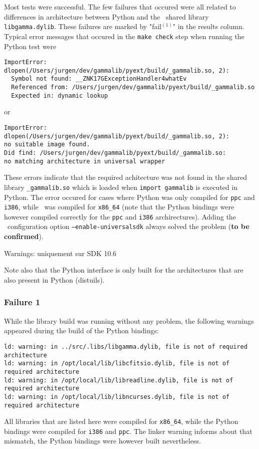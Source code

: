 \documentclass{article}[12pt,a4]
\begin{document}
Most tests were successful.
The few failures that occured were all related to differences in architecture between Python and
the \this\ shared library {\tt libgamma.dylib}.
These failures are marked by "fail$^{(1)}$" in the results column.
Typical error messages that occured in the {\tt make check} step when running the Python
test were
\begin{verbatim}
ImportError: dlopen(/Users/jurgen/dev/gammalib/pyext/build/_gammalib.so, 2): 
  Symbol not found: __ZNK17GExceptionHandler4whatEv
  Referenced from: /Users/jurgen/dev/gammalib/pyext/build/_gammalib.so
  Expected in: dynamic lookup
\end{verbatim}
or
\begin{verbatim}
ImportError: dlopen(/Users/jurgen/dev/gammalib/pyext/build/_gammalib.so, 2): 
no suitable image found.  
Did find: /Users/jurgen/dev/gammalib/pyext/build/_gammalib.so: 
no matching architecture in universal wrapper
\end{verbatim}
These errors indicate that the required achitecture was not found in the shared library
{\tt \_gammalib.so} which is loaded when {\tt import gammalib} is executed in Python.
The error occured for cases where Python was only compiled for {\tt ppc} and {\tt i386}, while
\this\ was compiled for {\tt x86\_64} (note that the Python bindings were however compiled
correctly for the {\tt ppc} and {\tt i386} archirectures).
Adding the \this\ configuration option {\tt --enable-universalsdk} always solved the problem
({\bf to be confirmed}).

Warnings: uniquement sur SDK 10.6

Note also that the Python interface is only built for the architectures that are also present in
Python (distuils).


\subsubsection{Failure 1}

While the library build was running without any problem, the following warnings appeared
during the build of the Python bindings:
\begin{verbatim}
ld: warning: in ../src/.libs/libgamma.dylib, file is not of required architecture
ld: warning: in /opt/local/lib/libcfitsio.dylib, file is not of required architecture
ld: warning: in /opt/local/lib/libreadline.dylib, file is not of required architecture
ld: warning: in /opt/local/lib/libncurses.dylib, file is not of required architecture
\end{verbatim}
All libraries that are listed here were compiled for {\tt x86\_64}, while the Python bindings
were compiled for {\tt i386} and {\tt ppc}.
The linker warning informs about that mismatch, the Python bindings were however built
nevertheless.
\end{document}
